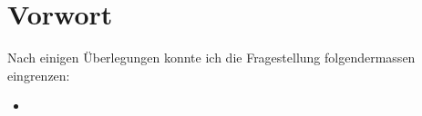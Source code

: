 \section{Vorwort}
\label{sec:vorwort}
Nach einigen Überlegungen konnte ich die Fragestellung folgendermassen eingrenzen:
\begin{itemize}
\item \maFRAGE
\end{itemize}

\blindtext

\blindtext
